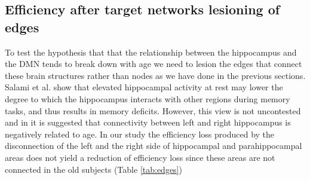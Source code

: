 \documentclass[12pt,a4paper]{article}
\begin{document}
\subsection{Efficiency after target networks lesioning of edges}
\label{ss:edges}
To test the hypothesis that that the relationship between the hippocampus and the DMN tends to break down with age we need to lesion the edges that connect these brain structures rather than nodes as we have done in the previous sections. 
Salami et al. show that \cite{salami_elevated_2014} elevated hippocampal activity at rest may lower the degree to which the hippocampus interacts with other regions during memory tasks, and thus results in memory deficits. However, this view is not uncontested and in \cite{Damoiseaux_2015} it is suggested that connectivity between left and right hippocampus is negatively related to age.
In our study the efficiency loss produced by the disconnection of the left and the right side of hippocampal and parahippocampal areas does not yield a reduction of efficiency loss since these areas are not connected in the old subjects (Table \ref{tab:edges}) 
\end{document}
